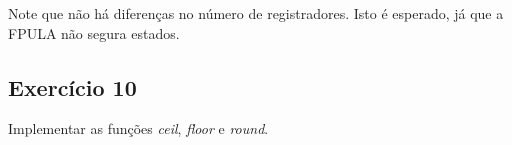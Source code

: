 \documentclass[12pt, a4paper, twoside]{article}
\begin{document}
Note que não há diferenças no número de registradores. Isto é esperado, já que a FPULA não segura estados.

\subsection{Exercício 10}

Implementar as funções \textit{ceil}, \textit{floor} e \textit{round}.
\end{document}
